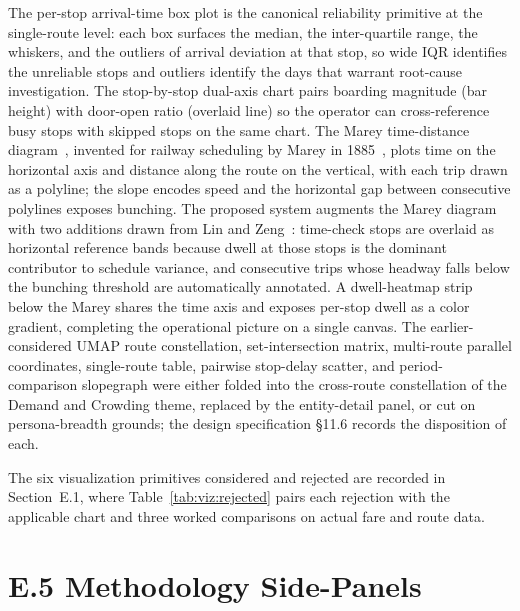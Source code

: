 The per-stop arrival-time box plot is the canonical reliability
primitive at the single-route level: each box surfaces the median,
the inter-quartile range, the whiskers, and the outliers of arrival
deviation at that stop, so wide IQR identifies the unreliable stops
and outliers identify the days that warrant root-cause investigation.
The stop-by-stop dual-axis chart pairs boarding magnitude (bar
height) with door-open ratio (overlaid line) so the operator can
cross-reference busy stops with skipped stops on the same chart. The
Marey time-distance diagram~\cite{linzeng2014}, invented for railway
scheduling by Marey in 1885~\cite{marey1885}, plots time on the
horizontal axis and distance along the route on the vertical, with
each trip drawn as a polyline; the slope encodes speed and the
horizontal gap between consecutive polylines exposes bunching. The
proposed system augments the Marey diagram with two additions drawn
from Lin and Zeng~\cite{linzeng2014}: time-check stops are overlaid
as horizontal reference bands because dwell at those stops is the
dominant contributor to schedule variance, and consecutive trips whose
headway falls below the bunching threshold are automatically
annotated. A dwell-heatmap strip below the Marey shares the time
axis and exposes per-stop dwell as a color gradient, completing the
operational picture on a single canvas. The earlier-considered UMAP
route constellation, set-intersection matrix, multi-route parallel
coordinates, single-route table, pairwise stop-delay scatter, and
period-comparison slopegraph were either folded into the cross-route
constellation of the Demand and Crowding theme, replaced by the
entity-detail panel, or cut on persona-breadth grounds; the design
specification §11.6 records the disposition of each.

The six visualization primitives considered and rejected are recorded
in Section~E.1, where Table~\ref{tab:viz:rejected} pairs each rejection
with the applicable chart and three worked comparisons on actual fare
and route data.

\section*{E.5 Methodology Side-Panels}
\label{sec:solution:viz:methodology}

